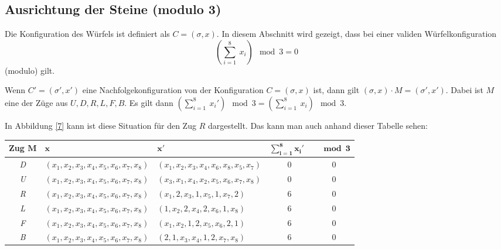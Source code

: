 \documentclass[12pt,a4paper, usenames, dvipsnames]{article}
\theoremstyle{mystyle}
\theoremstyle{definition}
\begin{document}
%
%
%
%
%
%
%
%
%
%
%
%
%
%
%
%
%
%
%
%
\subsection*{Ausrichtung der Steine (modulo 3)}

Die Konfiguration des Würfels ist definiert als $C=(\sigma, x)$. In diesem Abschnitt wird gezeigt, dass bei einer validen Würfelkonfiguration \begin{displaymath}
(\sum_{i= 1}^{8} \ x_i) \mod 3 = 0 
\end{displaymath}  (modulo) gilt. 

Wenn $C'=(\sigma', x')$ eine Nachfolgekonfiguration von der Konfiguration $C=(\sigma, x)$ ist, dann gilt  ${(\sigma, x) \cdot M = (\sigma', x')}$. Dabei ist $M$ eine der Züge aus $U, D, R, L, F, B$. Es gilt dann ${(\sum_{i= 1}^{8} \ x_i') \mod 3 = (\sum_{i= 1}^{8} \  x_i) \mod 3 }$.

In Abbildung \ref{7} kann ist diese Situation für den Zug $R$ dargestellt. Das kann man auch anhand dieser Tabelle sehen: 

\begin{adjustbox}{width=1\textwidth,center}

\begin{tabular}{cllcc}
\toprule
 \textbf{Zug} $\boldsymbol{M}$ & \hspace*{2.2cm}$\boldsymbol{x}$ & \hspace*{2cm} $\boldsymbol{x'}$ &  $\boldsymbol{\sum_{i= 1}^{8} x_i'} \ \ \ $ & $\boldsymbol{\mod 3}$ \\
\midrule
\textit{D} & $(x_1, x_2, x_3, x_4, x_5, x_6, x_7, x_8)$ & $(x_1, x_2, x_3, x_4, x_6, x_8, x_5, x_7)$ & 0 & 0 \\

\textit{U} & $(x_1, x_2, x_3, x_4, x_5, x_6, x_7, x_8)$ & $(x_3, x_1, x_4, x_2, x_5, x_6, x_7, x_8)$ & 0 & 0 \\

\textit{R} & $(x_1, x_2, x_3, x_4, x_5, x_6, x_7, x_8)$ & $(x_1, 2, x_3, 1, x_5, 1, x_7, 2)$ & 6 & 0 \\

\textit{L} & $(x_1, x_2, x_3, x_4, x_5, x_6, x_7, x_8)$ & $(1, x_2, 2, x_4, 2, x_6, 1, x_8)$ & 6 & 0 \\

\textit{F} & $(x_1, x_2, x_3, x_4, x_5, x_6, x_7, x_8)$ & $(x_1, x_2, 1, 2, x_5, x_6, 2, 1)$ & 6 & 0 \\

\textit{B} & $(x_1, x_2, x_3, x_4, x_5, x_6, x_7, x_8)$ & $(2, 1, x_3, x_4, 1, 2, x_7, x_8)$ & 6 & 0 \\
\bottomrule

\end{tabular}

\end{adjustbox}
\end{document}
